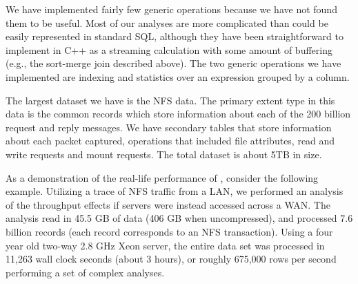 We have implemented fairly few generic operations because we have not
found them to be useful.  Most of our analyses are more complicated
than could be easily represented in standard SQL, although they have
been straightforward to implement in C++ as a streaming calculation with some
amount of buffering (e.g.,
the sort-merge join described above).  The two generic operations we have
implemented are indexing and statistics over an expression grouped by
a column.  
%

The largest dataset we have is the NFS data.  The primary extent type 
in this data is the common records which store information about each
of the 200 billion request and reply messages. We have secondary tables that
store information about each packet captured, operations that included
file attributes, read and write requests and mount requests.  The total dataset
is about 5TB in size.

As a demonstration of the real-life performance of
\DataSeries{}, consider the following example.  Utilizing a trace of NFS
traffic from a LAN, we performed an analysis of the throughput
effects if servers were instead accessed across a WAN.
The analysis read in 45.5 GB of data (406 GB when uncompressed), and
processed 7.6 billion records (each record corresponds to an NFS
transaction).  Using a four year old two-way 2.8 GHz Xeon server, the
entire data set was processed in 11,263 wall clock seconds (about 3
hours), or roughly 675,000 rows per second performing a set of complex
analyses.


